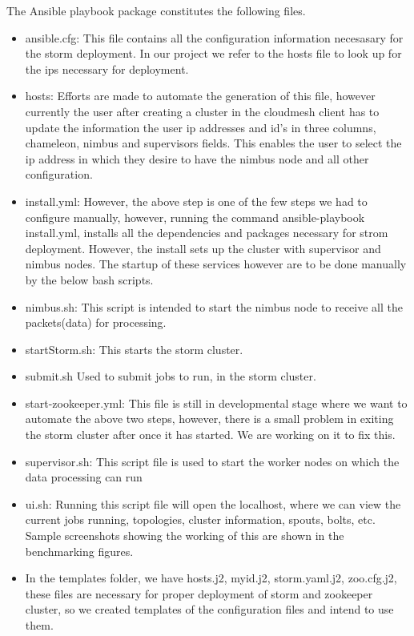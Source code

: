 \documentclass[9pt,twocolumn,twoside]{../../styles/osajnl}
\begin{document}
The Ansible playbook package constitutes the following files.
\begin{itemize}
\item ansible.cfg: This file contains all the configuration
  information necesasary for the storm deployment. In our project we
  refer to the hosts file to look up for the ips necessary for
  deployment.
  
\item hosts: Efforts are made to automate the generation of this file,
  however currently the user after creating a cluster in the cloudmesh
  client has to update the information the user ip addresses and id's
  in three columns, chameleon, nimbus and supervisors fields. This
  enables the user to select the ip address in which they desire to
  have the nimbus node and all other configuration.

\item install.yml: However, the above step is one of the few steps we
  had to configure manually, however, running the command
  ansible-playbook install.yml, installs all the dependencies and
  packages necessary for strom deployment. However, the install sets
  up the cluster with supervisor and nimbus nodes. The startup of
  these services however are to be done manually by the below bash
  scripts.

\item nimbus.sh: This script is intended to start the nimbus node to
  receive all the packets(data) for processing.
\item startStorm.sh: This starts the storm cluster.
\item submit.sh Used to submit jobs to run, in the storm cluster.
\item start-zookeeper.yml: This file is still in developmental stage
  where we want to automate the above two steps, however, there is a
  small problem in exiting the storm cluster after once it has
  started. We are working on it to fix this.
\item supervisor.sh: This script file is used to start the worker
  nodes on which the data processing can run
\item ui.sh: Running this script file will open the localhost, where
  we can view the current jobs running, topologies, cluster
  information, spouts, bolts, etc. Sample screenshots showing the
  working of this are shown in the benchmarking figures.
\item In the templates folder, we have hosts.j2, myid.j2,
  storm.yaml.j2, zoo.cfg.j2, these files are necessary for proper
  deployment of storm and zookeeper cluster, so we created templates
  of the configuration files and intend to use them.
\end{itemize}  
\end{document}
